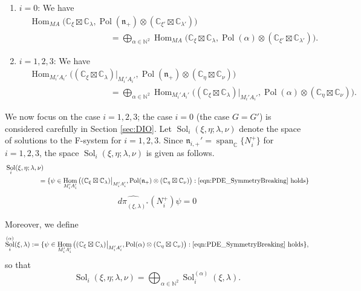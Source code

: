 \documentclass[a4paper,11pt,reqno]{amsart}
\newcommand{\frakn}{\mathfrak{n}}
\newcommand{\CC}{\mathbb{C}}
\newcommand{\NN}{\mathbb{N}}
\newcommand{\0}{{\bf 0}}
\newcommand{\N}{\mathbb{N}}
\newcommand{\C}{\mathbb{C}}
\newcommand{\1}{{\bf 1}}
\DeclareMathOperator{\Hom}{Hom}
\DeclareMathOperator{\Span}{span}
\DeclareMathOperator{\Pol}{Pol}
\DeclareMathOperator{\Sol}{Sol}
\theoremstyle{plain}
\theoremstyle{definition}
\numberwithin{equation}{section}
\theoremstyle{definition}
\begin{document}
\begin{enumerate}[label = \normalfont{(\arabic*)}]
\item $i=0$: We have
\begin{align}
&\Hom_{MA}\big(\CC_\xi\boxtimes \CC_{\lambda},\Pol(\frakn_+)\otimes (\CC_{\xi'}\boxtimes \CC_{\lambda'})\big) \nonumber \\[5pt]
&\hspace{4cm}
=\bigoplus_{\alpha \in \N^2}
\Hom_{MA}\big(\CC_\xi\boxtimes \CC_{\lambda},\Pol(\alpha)\otimes (\CC_{\xi'}\boxtimes \CC_{\lambda'})\big). \label{eqn:Homalpha2}
\end{align}

\item $i=1,2,3$: We have 
\begin{align}
&\Hom_{M_i'A_i'}\big((\CC_\xi\boxtimes \CC_{\lambda})\big\rvert_{M_i'A_i'},\Pol(\frakn_+)\otimes (\CC_\eta\boxtimes \CC_{\nu})\big) \nonumber \\[5pt]
&\hspace{4cm}
=\bigoplus_{\alpha \in \N^2}
\Hom_{M_i'A_i'}\big((\CC_\xi\boxtimes \CC_{\lambda})\big\rvert_{M_i'A_i'}, \Pol(\alpha)\otimes (\CC_\eta\boxtimes \CC_{\nu})\big). \label{eqn:Homalpha}
\end{align}
\end{enumerate}

We now focus on the case $i=1,2,3$;
the case $i=0$ (the case $G=G'$) is considered carefully in Section \ref{sec:DIO}.
Let $\Sol_i(\xi,\eta; \lambda,\nu)$ denote the space of solutions to the F-system for $i=1,2,3$.
Since  $\frakn_{i,+}'=\Span_\C\{N_i^+\}$ for $i=1,2,3$,
the space $\Sol_i(\xi,\eta; \lambda,\nu)$ is given as follows.
\begin{align}
&\Sol_i(\xi,\eta; \lambda,\nu) \nonumber\\
&\hspace{50pt}= \{ \psi \in 
\Hom_{M_i'A_i'}\big((\CC_\xi\boxtimes \CC_{\lambda})\big\rvert_{M_i'A_i'},\Pol(\frakn_+)\otimes (\CC_\eta\boxtimes \CC_{\nu})\big) : 
\text{\eqref{eqn:PDE_SymmetryBreaking} holds}\}
\end{align}
\begin{equation}\label{eqn:PDE_SymmetryBreaking}
\widehat{d\pi_{(\xi,\lambda)^*}}(N_i^+)\psi = 0
\end{equation}

Moreover, we define
\begin{align}
\Sol_i^{(\alpha)}(\xi,\lambda) 
:= \{ \psi \in \Hom_{M_i'A_i'}\big((\CC_\xi\boxtimes \CC_{\lambda})\big\rvert_{M_i'A_i'},\Pol(\alpha)\otimes (\CC_\eta\boxtimes \CC_{\nu})\big) : \text{\eqref{eqn:PDE_SymmetryBreaking} holds}\}, \label{eqn:Solalpha}
\end{align}
so that
\begin{equation}\label{eqn:SolDecomp}
\Sol_i(\xi,\eta; \lambda,\nu) 
= \bigoplus_{\alpha \in \NN^2}\Sol_i^{(\alpha)}(\xi,\lambda).
\end{equation}
\end{document}
